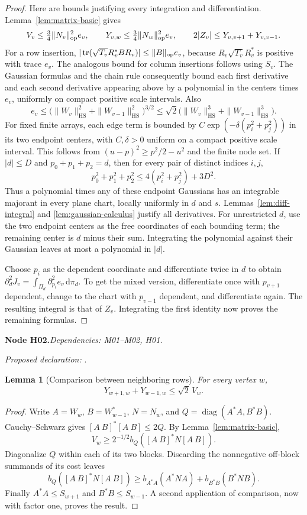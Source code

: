 \documentclass[11pt]{article}
\newtheorem{lemma}[theorem]{Lemma}
\theoremstyle{remark}\newtheorem{remark}[theorem]{Remark}
\newcommand{\dd}{\,\mathrm d}\newcommand{\tr}{\operatorname{tr}}
\newcommand{\HS}{\mathrm{HS}}\newcommand{\Rea}{\operatorname{Re}}
\newcommand{\bpnode}[3]{\par\Needspace{5\baselineskip}\noindent\textbf{Node #1.}\quad\textit{Dependencies: #2.}\par\noindent\textit{Proposed declaration:} \texttt{\detokenize{#3}}.\par\smallskip}
\begin{document}
\begin{proof}
Here are bounds justifying every integration and differentiation. Lemma~\ref{lem:matrix-basic} gives
\[
 V_v\leq\tfrac34\|N_v\|_{\mathrm{op}}^2e_v,\qquad
 Y_{v,w}\leq\tfrac34\|N_w\|_{\mathrm{op}}^2e_v,\qquad
 2|Z_v|\leq Y_{v,v+1}+Y_{v,v-1}.
\]
For a row insertion, $|\tr(\sqrt{T_v}R_v^*BR_v)|\leq\|B\|_{\op}e_v$, because $R_v\sqrt{T_v}R_v^*$ is positive with trace $e_v$. The analogous bound for column insertions follows using $S_v$. The Gaussian formulas and the chain rule consequently bound each first derivative and each second derivative appearing above by a polynomial in the centers times $e_v$, uniformly on compact positive scale intervals. Also
\[
 e_v\leq\bigl(\|W_v\|_{\HS}^2+\|W_{v-1}\|_{\HS}^2\bigr)^{3/2}
 \leq\sqrt2\bigl(\|W_v\|_{\HS}^3+\|W_{v-1}\|_{\HS}^3\bigr).
\]
For fixed finite arrays, each edge term is bounded by $C\exp(-\delta(p_i^2+p_j^2))$ in its two endpoint centers, with $C,\delta>0$ uniform on a compact positive scale interval. This follows from $(u-p)^2\ge p^2/2-u^2$ and the finite node set. If $|d|\le D$ and $p_0+p_1+p_2=d$, then for every pair of distinct indices $i,j$,
\[
 p_0^2+p_1^2+p_2^2\le4(p_i^2+p_j^2)+3D^2.
\]
Thus a polynomial times any of these endpoint Gaussians has an integrable majorant in every plane chart, locally uniformly in $d$ and $s$. Lemmas~\ref{lem:diff-integral} and \ref{lem:gaussian-calculus} justify all derivatives. For unrestricted $d$, use the two endpoint centers as the free coordinates of each bounding term; the remaining center is $d$ minus their sum. Integrating the polynomial against their Gaussian leaves at most a polynomial in $|d|$.

Choose $p_i$ as the dependent coordinate and differentiate twice in $d$ to obtain $\partial_d^2J_v=\int_{\Pi_d}\partial_{p_i}^2e_v\dd\pi_d$. To get the mixed version, differentiate once with $p_{v+1}$ dependent, change to the chart with $p_{v-1}$ dependent, and differentiate again. The resulting integral is that of $Z_v$. Integrating the first identity now proves the remaining formulas.
\end{proof}

\bpnode{H02}{M01--M02, H01}{neighbor_cost_comparison}
\begin{lemma}[Comparison between neighboring rows]\label{lem:neighbor}
For every vertex $w$,
\[
 Y_{w+1,w}+Y_{w-1,w}\leq\sqrt2\,V_w.
\]
\end{lemma}
\begin{proof}
Write $A=W_w$, $B=W_{w-1}^*$, $N=N_w$, and $Q=\operatorname{diag}(A^*A,B^*B)$. Cauchy--Schwarz gives $[A\ B]^*[A\ B]\leq2Q$. By Lemma~\ref{lem:matrix-basic},
\[
 V_w\geq2^{-1/2}b_Q([A\ B]^*N[A\ B]).
\]
Diagonalize $Q$ within each of its two blocks. Discarding the nonnegative off-block summands of its cost leaves
\[
 b_Q([A\ B]^*N[A\ B])\geq b_{A^*A}(A^*NA)+b_{B^*B}(B^*NB).
\]
Finally $A^*A\leq S_{w+1}$ and $B^*B\leq S_{w-1}$. A second application of comparison, now with factor one, proves the result.
\end{proof}
\end{document}
